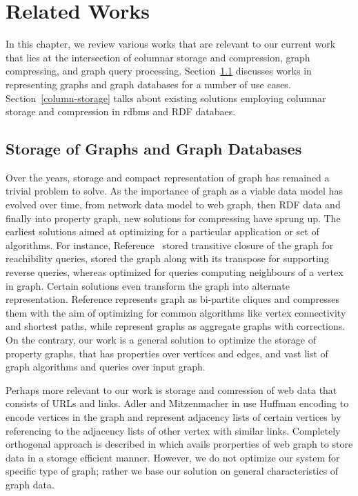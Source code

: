 \chapter{Related Works}
\label{c:related-works}

In this chapter, we review various works that are relevant to our current work that lies at the intersection of columnar storage and compression, graph compressing, and graph query processing. Section~\ref{graph-compression} discusses works in representing graphs and graph databases for a number of use cases. Section~\ref{column-storage} talks about existing solutions employing columnar storage and compression in \gls{rdbms} and RDF databaes. 

\section{Storage of Graphs and Graph Databases}
\label{graph-compression}

Over the years, storage and compact representation of graph has remained a trivial problem to solve. As the importance of graph as a viable data model has evolved over time, from network data model to web graph, then RDF data and finally into property graph, new solutions for compressing have sprung up. The earliest solutions aimed at optimizing for a particular application or set of algorithms. For instance, Reference~\cite{compress-transitive-closure} stored transitive closure of the graph for reachibility queries, \cite{Claude2010} stored the graph along with its transpose for supporting reverse queries, whereas \cite{compress-nbr-q} optimized for queries computing neighbours of a vertex in graph. Certain solutions even transform the graph into alternate representation. Reference \cite{feder} represents graph as bi-partite cliques and compresses them with the aim of optimizing for common algorithms like vertex connectivity and shortest paths, while \cite{graph-summ} represent graphs as aggregate graphs with corrections. On the contrary, our work is a general solution to optimize the storage of property graphs, that has properties over vertices and edges, and vast list of graph algorithms and queries over input graph.

Perhaps more relevant to our work is storage and comression of web data that consists of URLs and links. Adler and Mitzenmacher in \cite{adler} use Huffman encoding to encode vertices in the graph and represent adjacency lists of certain vertices by referencing to the adjacency lists of other vertex with similar links. Completely orthogonal approach is described in \cite{suel} which avails prorperties of web graph to store data in a storage efficient manner. However, we do not optimize our system for specific type of graph; rather we base our solution on general characteristics of graph data.

